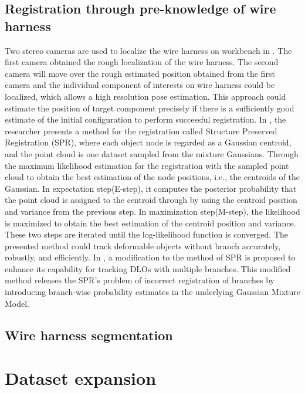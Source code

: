 \subsection{Registration through pre-knowledge of wire harness}
    Two stereo cameras are used to localize the wire harness 
    on workbench in \cite{10.1007/978-3-031-27933-1_31}. The first camera obtained the rough localization of the wire harness. The second camera will move over the rough estimated position 
    obtained from the first camera and the individual component of interests on wire harness could be localized, which allows a high resolution pose estimation. This approach could estimate 
    the position of target component precisely if there is a sufficiently good estimate of the initial configuration to perform successful registration.
    In \cite{doi:10.1177/0278364919841431}, the researcher presents a method for the registration called Structure Preserved Registration (SPR), where each object node is regarded as a Gaussian 
    centroid, and the point cloud is one dataset sampled from the mixture Gaussians. Through the maximum likelihood estimation for the registration with the sampled point cloud to obtain the 
    best estimation of the node positions, i.e., the centroids of the Gaussian. In expectation step(E-step), it computes the posterior probability that the point cloud is assigned to the
    centroid through by using the centroid position and variance from the previous step. In maximization step(M-step), the likelihood is maximized to obtain the best estimation of the centroid position 
    and variance. These two steps are iterated until the log-likelihood function is converged. The presented method could track deformable objects without branch accurately, robustly, and efficiently. 
    In \cite{9665147}, a modification to the method of SPR is proposed to enhance its capability for tracking DLOs with multiple branches. This modified method releases the SPR's problem of incorrect 
    registration of branches by introducing branch-wise probability estimates in the underlying Gaussian Mixture Model.

\subsection{Wire harness segmentation}

\section{Dataset expansion}

